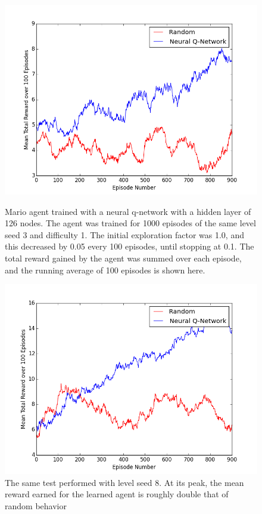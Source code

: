 \documentclass{article}
\begin{document}
 \begin{figure}
 \begin{center}
\includegraphics[scale=0.42]{progress_report.png}
\caption{Mario agent trained with a neural q-network with a hidden layer of 126 nodes. The agent was trained for 1000 episodes of the same level seed 3 and difficulty 1. The initial exploration factor was 1.0, and this decreased by 0.05 every 100 episodes, until stopping at 0.1. The total reward gained by the agent was summed over each episode, and the running average of 100 episodes is shown here.}
\includegraphics[scale=0.42]{seed8.png}
\caption{The same test performed with level seed 8. At its peak, the mean reward earned for the learned agent is roughly double that of random behavior}

\end{center}
\end{figure}
\end{document}
